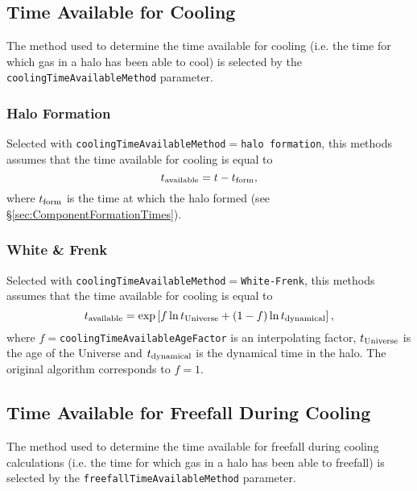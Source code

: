 \subsection{Time Available for Cooling}\label{sec:TimeAvailableCooling}

The method used to determine the time available for cooling (i.e. the time for which gas in a halo has been able to cool) is selected by the {\tt coolingTimeAvailableMethod} parameter.

\subsubsection{Halo Formation}

Selected with {\tt coolingTimeAvailableMethod}$=${\tt halo formation}, this methods assumes that the time available for cooling is equal to
\begin{equation}
 t_{\rm available} = t - t_{\rm form},
\end{equation}
where $t_{\rm form}$ is the time at which the halo formed (see \S\ref{sec:ComponentFormationTimes}).

\subsubsection{White \& Frenk}

Selected with {\tt coolingTimeAvailableMethod}$=${\tt White-Frenk}, this methods assumes that the time available for cooling is equal to
\begin{equation}
 t_{\rm available} = \exp\left[ f \ln t_{\rm Universe} + (1-f)\ln t_{\rm dynamical} \right],
\end{equation}
where $f=${\tt coolingTimeAvailableAgeFactor} is an interpolating factor, $t_{\rm Universe}$ is the age of the Universe and $t_{\rm dynamical}$ is the dynamical time in the halo. The original \cite{white_galaxy_1991} algorithm corresponds to $f=1$.


\subsection{Time Available for Freefall During Cooling}\label{sec:TimeAvailableFreefall}

The method used to determine the time available for freefall during cooling calculations (i.e. the time for which gas in a halo has been able to freefall) is selected by the {\tt freefallTimeAvailableMethod} parameter.

